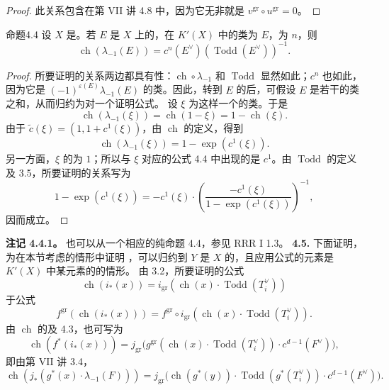 \begin{proof}
此关系包含在第 VII 讲 4.8 中，因为它无非就是 $v^{\mathrm{gr}}\circ u^{\mathrm{gr}}=0$。
\end{proof}
\begin{SGAresult}{命题}{4.4}
设 $X$ 是。若 $E$ 是 $X$ 上的，在 $K'(X)$ 中的类为 $E$，为 $n$，则
\[\operatorname{ch}(\lambda_{-1}(E))=c^n(E^\vee)(\operatorname{Todd}(E^\vee))^{-1}.\]
\end{SGAresult}
\begin{proof}
所要证明的关系两边都具有性：$\operatorname{ch}\circ\lambda_{-1}$ 和 $\operatorname{Todd}$ 显然如此；$c^n$ 也如此，因为它是 $(-1)^{\varepsilon(E)}\lambda_{-1}(E)$ 的类。因此，转到 $E$ 的后，可假设 $E$ 是若干的类之和，从而归约为对一个证明公式。
设 $\xi$ 为这样一个的类。于是
\[\operatorname{ch}(\lambda_{-1}(\xi))=\operatorname{ch}(1-\xi)=1-\operatorname{ch}(\xi).\]
由于 $\widetilde c(\xi)=(1,1+c^1(\xi))$，由 $\operatorname{ch}$ 的定义，得到
\[\operatorname{ch}(\lambda_{-1}(\xi))=1-\exp(c^1(\xi)).\]
另一方面，$\xi$ 的为 $1$；所以与 $\xi$ 对应的公式 4.4 中出现的是 $c^1$。由 $\operatorname{Todd}$ 的定义及 3.5，所要证明的关系写为
\[1-\exp(c^1(\xi))=-c^1(\xi)\cdot\left(\frac{-c^1(\xi)}{1-\exp(c^1(\xi))}\right)^{-1},\]
因而成立。
\end{proof}
\textbf{注记 4.4.1。} 也可以从一个相应的纯命题 4.4，参见 RRR I 1.3。
\textbf{4.5.} 下面证明，为在本节考虑的情形中证明 ，可以归约到 $Y$ 是 $X$ 的，且应用公式的元素是 $K'(X)$ 中某元素的的情形。
由 3.2，所要证明的公式
\[\operatorname{ch}(i_*(x))=i_{\mathrm{gr}}(\operatorname{ch}(x)\cdot\operatorname{Todd}(T_i^\vee))\]
于公式
\[f^{\mathrm{gr}}(\operatorname{ch}(i_*(x)))=f^{\mathrm{gr}}\circ i_{\mathrm{gr}}(\operatorname{ch}(x)\cdot\operatorname{Todd}(T_i^\vee)).\]
由 $\operatorname{ch}$ 的及 4.3，也可写为
\[\operatorname{ch}(f^*(i_*(x)))=j_{\mathrm{gr}}\bigl(g^{\mathrm{gr}}(\operatorname{ch}(x)\cdot\operatorname{Todd}(T_i^\vee))\cdot c^{d-1}(F^\vee)\bigr),\]
即由第 VII 讲 3.4，
\[\operatorname{ch}(j_*(g^*(x)\cdot\lambda_{-1}(F)))=j_{\mathrm{gr}}\bigl(\operatorname{ch}(g^*(y))\cdot\operatorname{Todd}(g^*(T_i^\vee))\cdot c^{d-1}(F^\vee)\bigr).\]
